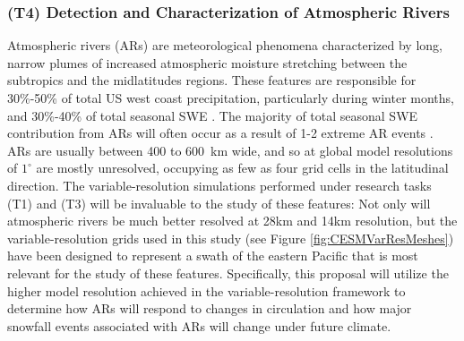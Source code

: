 \documentclass[11pt]{article}
\begin{document}

\subsubsection{(T4) Detection and Characterization of Atmospheric Rivers}

Atmospheric rivers (ARs) are meteorological phenomena characterized by long, narrow plumes of increased atmospheric moisture stretching between the subtropics and the midlatitudes regions.  These features are responsible for 30\%-50\% of total US west coast precipitation, particularly during winter months, and 30\%-40\% of total seasonal SWE \citep{dettinger2011atmospheric}.  The majority of total seasonal SWE contribution from ARs will often occur as a result of 1-2 extreme AR events \citep{guan2010extreme}.  ARs are usually between 400 to 600\ km wide, and so at global model resolutions of $1^\circ$ are mostly unresolved, occupying as few as four grid cells in the latitudinal direction.  The variable-resolution simulations performed under research tasks (T1) and (T3) will be invaluable to the study of these features: Not only will atmospheric rivers be much better resolved at 28km and 14km resolution, but the variable-resolution grids used in this study (see Figure \ref{fig:CESMVarResMeshes}) have been designed to represent a swath of the eastern Pacific that is most relevant for the study of these features.  Specifically, this proposal will utilize the higher model resolution achieved in the variable-resolution framework to determine how ARs will respond to changes in circulation and how major snowfall events associated with ARs will change under future climate.
\end{document}
